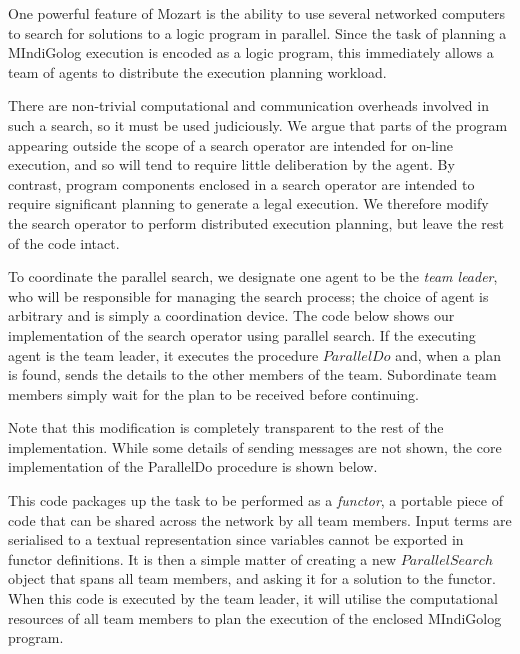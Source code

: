 One powerful feature of Mozart is the ability to use several networked
computers to search for solutions to a logic program in parallel.
Since the task of planning a MIndiGolog execution is encoded as a
logic program, this immediately allows a team of agents to distribute
the execution planning workload.

There are non-trivial computational and communication overheads involved
in such a search, so it must be used judiciously. We argue that parts
of the program appearing outside the scope of a search operator are
intended for on-line execution, and so will tend to require little
deliberation by the agent. By contrast, program components enclosed
in a search operator are intended to require significant planning
to generate a legal execution. We therefore modify the search operator
to perform distributed execution planning, but leave the rest of the
code intact.

To coordinate the parallel search, we designate one agent to be the
\emph{team leader}, who will be responsible for managing the search
process; the choice of agent is arbitrary and is simply a coordination
device. The code below shows our implementation of the search operator
using parallel search. If the executing agent is the team leader,
it executes the procedure $ParallelDo$ and, when a plan is found,
sends the details to the other members of the team. Subordinate team
members simply wait for the plan to be received before continuing.


Note that this modification is completely transparent to the rest
of the implementation. While some details of sending messages are
not shown, the core implementation of the ParallelDo procedure is
shown below.


This code packages up the task to be performed as a \emph{functor},
a portable piece of code that can be shared across the network by
all team members. Input terms are serialised to a textual representation
since variables cannot be exported in functor definitions. It is then
a simple matter of creating a new $ParallelSearch$ object that spans
all team members, and asking it for a solution to the functor. When
this code is executed by the team leader, it will utilise the computational
resources of all team members to plan the execution of the enclosed
MIndiGolog program.

